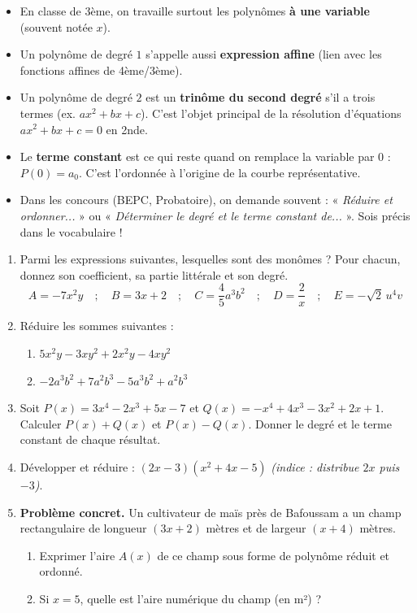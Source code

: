 \documentclass[11pt]{article}
\begin{document}
\begin{savaistu}
\begin{itemize}
    \item En classe de 3ème, on travaille surtout les polynômes \textbf{à une variable} (souvent notée $x$).
    \item Un polynôme de degré $1$ s'appelle aussi \textbf{expression affine} (lien avec les fonctions affines de 4ème/3ème).
    \item Un polynôme de degré $2$ est un \textbf{trinôme du second degré} s'il a trois termes (ex. $ax^2+bx+c$). C'est l'objet principal de la résolution d'équations $ax^2+bx+c=0$ en 2nde.
    \item Le \textbf{terme constant} est ce qui reste quand on remplace la variable par $0$ : $P(0) = a_0$. C'est l'ordonnée à l'origine de la courbe représentative.
    \item Dans les concours (BEPC, Probatoire), on demande souvent : « \textit{Réduire et ordonner...} » ou « \textit{Déterminer le degré et le terme constant de...} ». Sois précis dans le vocabulaire !
\end{itemize}
\end{savaistu}

\begin{exercice}
\begin{enumerate}
    \item Parmi les expressions suivantes, lesquelles sont des monômes ? Pour chacun, donnez son coefficient, sa partie littérale et son degré.
    \[
    A = -7x^2y \quad;\quad B = 3x + 2 \quad;\quad C = \frac{4}{5}a^3b^2 \quad;\quad D = \frac{2}{x} \quad;\quad E = -\sqrt{2}\,u^4v
    \]
    \item Réduire les sommes suivantes :
    \begin{enumerate}
        \item $5x^2y - 3xy^2 + 2x^2y - 4xy^2$
        \item $-2a^3b^2 + 7a^2b^3 - 5a^3b^2 + a^2b^3$
    \end{enumerate}
    \item Soit $P(x) = 3x^4 - 2x^3 + 5x - 7$ et $Q(x) = -x^4 + 4x^3 - 3x^2 + 2x + 1$.
    Calculer $P(x) + Q(x)$ et $P(x) - Q(x)$. Donner le degré et le terme constant de chaque résultat.
    \item Développer et réduire : $(2x - 3)(x^2 + 4x - 5)$ \textit{(indice : distribue $2x$ puis $-3$)}.
    \item \textbf{Problème concret.} Un cultivateur de maïs près de Bafoussam a un champ rectangulaire de longueur $(3x+2)$ mètres et de largeur $(x+4)$ mètres.
    \begin{enumerate}
        \item Exprimer l'aire $A(x)$ de ce champ sous forme de polynôme réduit et ordonné.
        \item Si $x=5$, quelle est l'aire numérique du champ (en m²) ?
    \end{enumerate}
\end{enumerate}
\end{exercice}
\end{document}
